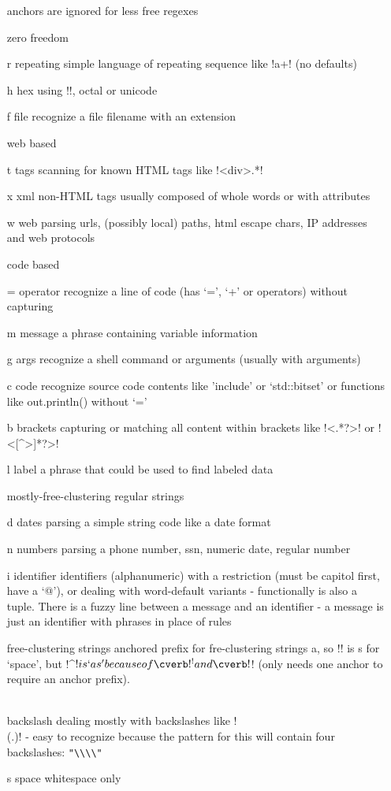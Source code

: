 \begin{itemize}
anchors are ignored for less free regexes

zero freedom
\item[ r ] repeating     simple language of repeating sequence like \cverb!a+! (no defaults)
\item[ h ] hex           using \cverb!\x[a-f0-9][a-f0-9]!, octal or unicode
\item[ f ] file       recognize a file filename with an extension

web based
\item[ t ] tags      scanning for known HTML tags like \cverb!<div>.*!
\item[ x ] xml       non-HTML tags usually composed of whole words or with attributes
\item[ w ] web       parsing urls, (possibly local) paths, html escape chars, IP addresses and web protocols

code based
\item[ = ] operator  recognize a line of code (has `=', `+' or operators) without capturing
\item[ m ] message      a phrase containing variable information
\item[ g ] args         recognize a shell command or arguments (usually with arguments)
\item[ c ] code         recognize source code contents like 'include' or `std::bitset' or functions like out.println() without `='
\item[ b ] brackets  capturing or matching all content within brackets like \cverb!<.*?>! or \cverb!<[^>]*?>!
\item[ l ] label        a phrase that could be used to find labeled data

mostly-free-clustering regular strings

\item[ d ] dates         parsing a simple string code like a date format
\item[ n ] numbers       parsing a phone number, ssn, numeric date, regular number
\item[ i ] identifier    identifiers (alphanumeric) with a restriction (must be capitol first, have a `@'), or dealing with word-default variants - functionally is also a tuple.  There is a fuzzy line between a message and an identifier - a message is just an identifier with phrases in place of rules

free-clustering strings
anchored prefix for fre-clustering strings a, so \cverb!\s*! is s for `space', but \cverb!^\s*$! is `as' because of \cverb!^! and \cverb!$! (only needs one anchor to require an anchor prefix).
\item[ \\ ] backslash    dealing mostly with backslashes like \cverb!\\(.)! - easy to recognize because the pattern for this will contain four backslashes: \verb!"\\\\"!
\item[ s ] space         whitespace only


\end{itemize}
